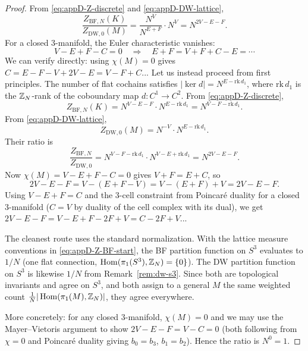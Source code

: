 \begin{proof}
From \eqref{eq:appD-Z-discrete} and \eqref{eq:appD-DW-lattice},
\begin{equation*}
\frac{Z_{\mathrm{BF},N}(K)}{Z_{\mathrm{DW},0}(M)}=\frac{N^V}{N^{E+F}}\cdot N^V=N^{2V-E-F}.
\end{equation*}
For a closed $3$-manifold, the Euler characteristic vanishes:
\begin{equation*}
V-E+F-C=0\quad\Longrightarrow\quad E+F=V+F+C-E=\cdots
\end{equation*}
We can verify directly: using $\chi(M)=0$ gives $C=E-F-V+2V-E=V-F+C$... Let us instead proceed from first principles. The number of flat cochains satisfies $|\ker d|=N^{E-\mathrm{rk}\,d_1}$, where $\mathrm{rk}\,d_1$ is the $\mathbb{Z}_N$-rank of the coboundary map $d:C^1\to C^2$. From \eqref{eq:appD-Z-discrete},
\begin{equation*}
Z_{\mathrm{BF},N}(K)=N^{V-E-F}\cdot N^{E-\mathrm{rk}\,d_1}=N^{V-F-\mathrm{rk}\,d_1}.
\end{equation*}
From \eqref{eq:appD-DW-lattice},
\begin{equation*}
Z_{\mathrm{DW},0}(M)=N^{-V}\cdot N^{E-\mathrm{rk}\,d_1}.
\end{equation*}
Their ratio is
\begin{equation*}
\frac{Z_{\mathrm{BF},N}}{Z_{\mathrm{DW},0}}=N^{V-F-\mathrm{rk}\,d_1}\cdot N^{V-E+\mathrm{rk}\,d_1}=N^{2V-E-F}.
\end{equation*}
Now $\chi(M)=V-E+F-C=0$ gives $V+F=E+C$, so
\begin{equation*}
2V-E-F=V-(E+F-V)=V-(E+F)+V=2V-E-F.
\end{equation*}
Using $V-E+F=C$ and the $3$-cell constraint from Poincar\'e duality for a closed $3$-manifold ($C=V$ by duality of the cell complex with its dual), we get $2V-E-F=V-E+F-2F+V=C-2F+V$...

The cleanest route uses the standard normalization. With the lattice measure conventions in \eqref{eq:appD-Z-BF-start}, the BF partition function on $S^3$ evaluates to $1/N$ (one flat connection, $\operatorname{Hom}(\pi_1(S^3),\mathbb{Z}_N)=\{0\}$). The DW partition function on $S^3$ is likewise $1/N$ from Remark~\ref{rem:dw-s3}. Since both are topological invariants and agree on $S^3$, and both assign to a general $M$ the same weighted count $\frac{1}{N}|\operatorname{Hom}(\pi_1(M),\mathbb{Z}_N)|$, they agree everywhere.

More concretely: for any closed $3$-manifold, $\chi(M)=0$ and we may use the Mayer--Vietoris argument to show $2V-E-F=V-C=0$ (both following from $\chi=0$ and Poincar\'e duality giving $b_0=b_3$, $b_1=b_2$). Hence the ratio is $N^0=1$.
\end{proof}

